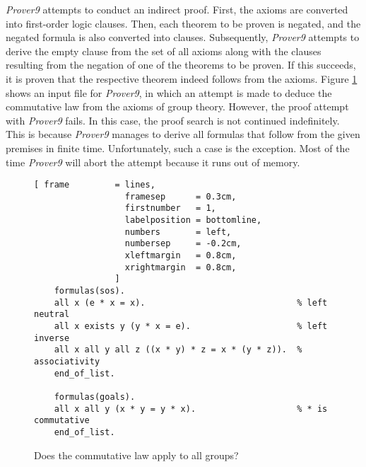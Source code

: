 \textsl{Prover9} attempts to conduct an indirect proof. First, the axioms are converted into first-order logic
clauses. Then, each theorem to be proven is negated, and the negated formula is also converted into
clauses. Subsequently, \textsl{Prover9} attempts to derive the empty clause from the set of all axioms along
with the clauses resulting from the negation of one of the theorems to be proven. If this succeeds, it is
proven that the respective theorem indeed follows from the axioms. Figure \ref{fig:group-commutative.in} shows
an input file for \textsl{Prover9}, in which an attempt is made to deduce the commutative law from the axioms
of group theory. However, the proof attempt with \textsl{Prover9} fails. In this case, the proof search is not
continued indefinitely. This is because \textsl{Prover9} manages to derive all formulas that follow from the
given premises in finite time. Unfortunately, such a case is the exception.  Most of the time \textsl{Prover9}
will abort the attempt because it runs out of memory. 
 
\begin{figure}[!ht]
\centering
\begin{Verbatim}[ frame         = lines, 
                  framesep      = 0.3cm, 
                  firstnumber   = 1,
                  labelposition = bottomline,
                  numbers       = left,
                  numbersep     = -0.2cm,
                  xleftmargin   = 0.8cm,
                  xrightmargin  = 0.8cm,
                ]
    formulas(sos).
    all x (e * x = x).                              % left neutral 
    all x exists y (y * x = e).                     % left inverse
    all x all y all z ((x * y) * z = x * (y * z)).  % associativity
    end_of_list.
    
    formulas(goals).
    all x all y (x * y = y * x).                    % * is commutative
    end_of_list.
\end{Verbatim}
\vspace*{-0.3cm}
\caption{Does the commutative law apply to all groups?}
\label{fig:group-commutative.in}
\end{figure}


